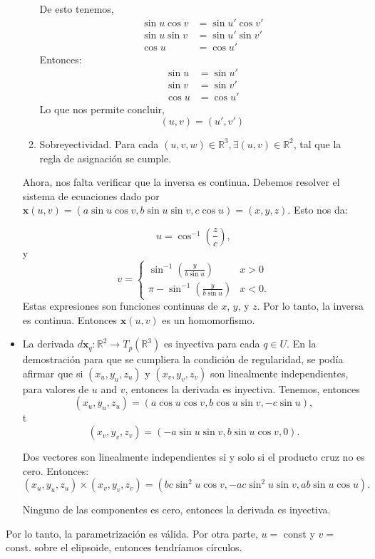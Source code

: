 \begin{problema}
\begin{sol}
\begin{itemize}
\begin{enumerate}
            De esto tenemos, 
            \begin{align*}
                \sin u \cos v &= \sin u' \cos v'\\
                \sin u \sin v &= \sin u' \sin v'\\
                \cos u &= \cos u'
            \end{align*}
            Entonces:
            \begin{align*}
                \sin u  &= \sin u'\\
                \sin v &= \sin v'\\
                \cos u &= \cos u'
            \end{align*}
            Lo que nos permite concluir, 
            $$(u,v)=(u',v')$$
            \item Sobreyectividad. Para cada $(u,v,w)\in \mathbb{R}^3, \exists (u,v)\in \mathbb{R}^2$, tal que la regla de asignación se cumple.   
        \end{enumerate}
        
        Ahora, nos falta verificar que la inversa es continua. Debemos resolver el sistema de ecuaciones dado por $\mathbf{x}(u,v) = (a \sin u \cos v, b \sin u \sin v, c \cos u)=(x,y,z)$. Esto nos da: 
        
        $$ u = \cos^{-1}\left(\frac{z}{c}\right), $$ 
        y 
        $$ v = \begin{cases} \sin^{-1}\left(\frac{y}{b\sin u}\right) & x > 0 \\\pi - \sin^{-1}\left(\frac{y}{b\sin u}\right) & x < 0. \end{cases} $$
        Estas expresiones son funciones continuas de $x$, $y$, y $z$. Por lo tanto, la inversa es continua. Entonces $\mathbf{x}(u,v)$ es un homomorfismo.
        \item La derivada $d\mathbf{x}_q: \mathbb{R}^2 \rightarrow T_p(\mathbb{R}^3)$ es inyectiva para cada $q\in U$. En la demostración para que se cumpliera la condición de regularidad, se podía afirmar que si $(x_u,y_u,z_u)$ y $(x_v,y_v,z_v)$ son linealmente independientes, para valores de $u$ and $v$, entonces la derivada es inyectiva. Tenemos, entonces $$ (x_u,y_u,z_u) = (a \cos u \cos v,b \cos u \sin v,-c \sin u), $$ t $$ (x_v,y_v,z_v) = (-a \sin u \sin v,b \sin u \cos v,0). $$

        Dos vectores son linealmente independientes si y solo si el producto cruz no es cero. Entonces:  $$ (x_u,y_u,z_u) \times (x_v,y_v,z_v) = (bc\sin^2u\cos v,-ac\sin^2u\sin v,ab\sin u\cos u). $$
        
        Ninguno de las componentes es cero, entonces la derivada es inyectiva. 
    \end{itemize}
    Por lo tanto, la parametrización es válida. Por otra parte, $u=$ const y $v=$ const. sobre el elipsoide, entonces tendríamos círculos. 
\end{sol}
\end{problema}


